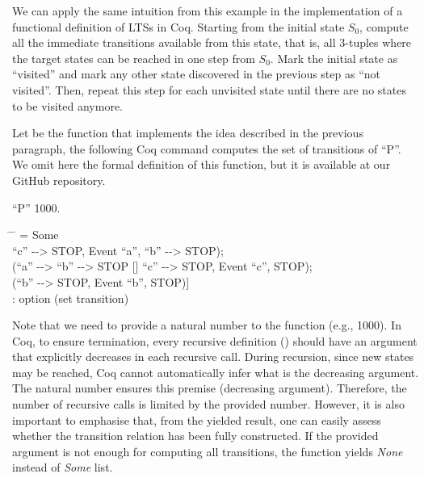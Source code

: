 We can apply the same intuition from this example in the implementation of a functional definition of LTSs in Coq. Starting from the initial state $S_{0}$, compute all the immediate transitions available from this state, that is, all 3-tuples where the target states can be reached in one step from $ S_{0} $. Mark the initial state as ``visited'' and mark any other state discovered in the previous step as ``not visited''. Then, repeat this step for each unvisited state until there are no states to be visited anymore.

Let  be the function that implements the idea described in the previous paragraph, the following Coq command computes the set of transitions of ``P''. We omit here the formal definition of this function, but it is available at our GitHub repository.

\begin{coqdoccode}
	\coqdocnoindent
	   ``P'' 1000.\coqdoceol
\end{coqdoccode}

\begin{tabbing}
	\hspace*{2.5em}\= \hspace*{2em} \= \kill
	= Some\\
	\>	[(``a'' -{}-> ``b'' -{}-> STOP [] ``c'' -{}-> STOP, Event ``a'', ``b'' -{}-> STOP);\\
	\>	(``a'' -{}-> ``b'' -{}-> STOP [] ``c'' -{}-> STOP, Event ``c'', STOP);\\
	\>	(``b'' -{}-> STOP, Event ``b'', STOP)]\\
	: option (set transition)
\end{tabbing}

Note that we need to provide a natural number to the function  (e.g., 1000). In Coq, to ensure termination, every recursive definition () should have an argument that explicitly decreases in each recursive call. During recursion, since new states may be reached, Coq cannot automatically infer what is the decreasing argument. The natural number ensures this premise (decreasing argument). Therefore, the number of recursive calls is limited by the provided number. However, it is also important to emphasise that, from the yielded result, one can easily assess whether the transition relation has been fully constructed. If the provided argument is not enough for computing all transitions, the function yields \emph{None} instead of \emph{Some} list.

